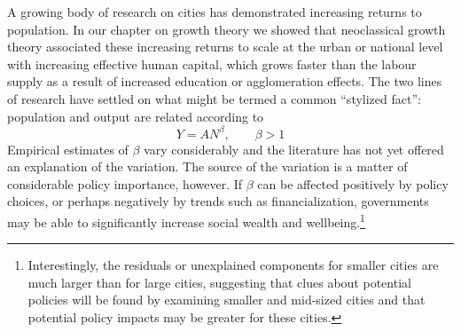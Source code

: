 A growing body of research on cities has demonstrated increasing returns to population. In our chapter on growth theory we showed that neoclassical growth theory associated these increasing returns to scale at the urban or national level with increasing effective human capital, which grows faster than the labour supply as a result of increased education or agglomeration effects. The two lines of research have settled on what might be termed a  common ``stylized  fact'': population and output are related according to 
\begin{equation}
    Y=AN^\beta,\qquad \beta>1 \label{equation-the-fact}
\end{equation}
Empirical estimates of $\beta$ vary considerably\cite{rosenthalEvidenceNatureSources2004}\cite{bettencourtIntroductionUrbanScience2021} \cite{loboUrbanScalingProduction2013} 
% 
and the literature has not yet offered an explanation  of the variation.\cite{loboUrbanScalingProduction2013} The source of the variation is a matter of considerable policy importance, however. If $\beta$ can be affected positively by policy choices, or perhaps negatively by trends such as financialization, governments may be able to significantly increase social wealth and wellbeing.\footnote{Interestingly, the residuals or unexplained components for smaller cities are much larger than for large cities, suggesting that clues about potential policies will be found by examining smaller and mid-sized cities and that potential policy impacts may be greater for these cities.}

